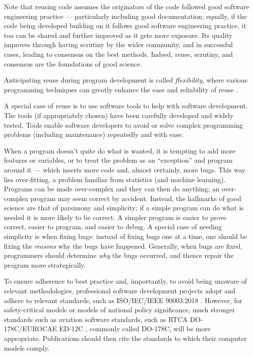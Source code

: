 \documentclass[10pt,a4paper]{article}
\begin{document}
Note that reusing code assumes the originators of the code followed good software engineering practice --- particularly including good documentation; equally, if the code being developed building on it follows good software engineering practice, it too can be shared and further improved as it gets more exposure. Its quality improves through having scrutiny by the wider community, and in successful cases, leading to consensus on the best methods. Indeed, reuse, scrutiny, and consensus are the foundations of good science.

Anticipating reuse during program development is called \emph{flexibility}, where various programming techniques can greatly enhance the ease and reliability of reuse \cite{flexibility}.

A special case of reuse is to use software tools to help with software development. The tools (if appropriately chosen) have been carefully developed and widely tested. Tools enable software developers to avoid or solve complex programming problems (including maintenance) repeatedly and with ease.

When a program doesn't quite do what is wanted, it is tempting to add more features or variables, or to treat the problem as an ``exception'' and program around it --- which inserts more code and, almost certainly, more bugs. This way lies over-fitting, a problem familiar from statistics (and machine learning). Programs can be made over-complex and they can then do anything; an over-complex program may seem correct by accident. Instead, the hallmarks of good science are that of parsimony and simplicity; if a simple program can do what is needed it is more likely to be correct. A simpler program is easier to prove correct, easier to program, and easier to debug. A special case of needing simplicity is when fixing bugs: instead of fixing bugs one at a time, one should be fixing the \emph{reasons\/} why the bugs have happened. Generally, when bugs are fixed, programmers should determine \emph{why\/} the bugs occurred, and thence repair the program more strategically.



To ensure adherence to best practice and, importantly, to avoid being unaware of relevant methodologies, professional software development projects adopt and adhere to relevant standards, such as ISO/IEC/IEEE 90003:2018 \cite{iso}. However, for safety-critical models or models of national policy significance, much stronger standards such as aviation software standards, such as RTCA DO-178C/EUROCAE ED-12C \cite{178C}, commonly called DO-178C, will be more appropriate. Publications should then cite the  standards to which their computer models comply. 
\end{document}
